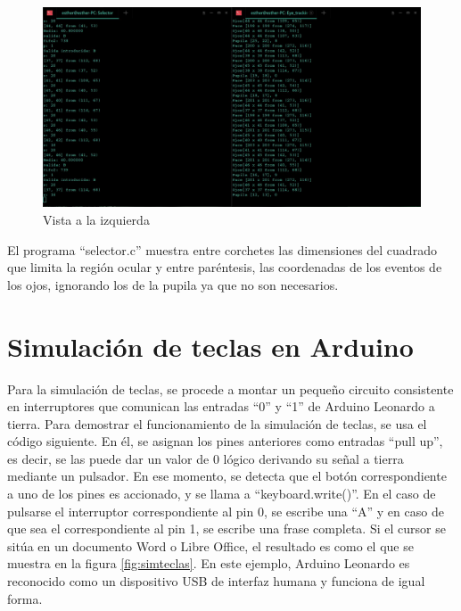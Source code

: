     \begin{figure}[H]
    \centering
    \includegraphics[scale = 0.3]{capitulo_04/figuras_dir/ldizq.jpg}
    \caption{Vista a la izquierda}
    \end{figure}


El programa ``selector.c'' muestra entre corchetes las dimensiones del cuadrado que limita la región ocular y entre paréntesis, las coordenadas de los eventos de los ojos, ignorando los de la pupila ya que no son necesarios. 

\clearpage
\section{Simulación de teclas en Arduino} \label{s4_6}

Para la simulación de teclas, se procede a montar un pequeño circuito consistente en interruptores que comunican las entradas ``0'' y ``1'' de Arduino Leonardo a tierra. Para demostrar el funcionamiento de la simulación de teclas, se usa el código siguiente. En él, se asignan los pines anteriores como entradas ``pull up'', es decir, se las puede dar un valor de 0 lógico derivando su señal a tierra mediante un pulsador. En ese momento, se detecta que el botón correspondiente a uno de los pines es accionado, y se llama a ``keyboard.write()''. En el caso de pulsarse el interruptor correspondiente al pin 0, se escribe una ``A'' y en caso de que sea el correspondiente al pin 1, se escribe una frase completa. Si el cursor se sitúa en un documento Word o Libre Office, el resultado es como el que se muestra en la figura \ref{fig:simteclas}. En este ejemplo, Arduino Leonardo es reconocido como un dispositivo USB de interfaz humana y funciona de igual forma.




